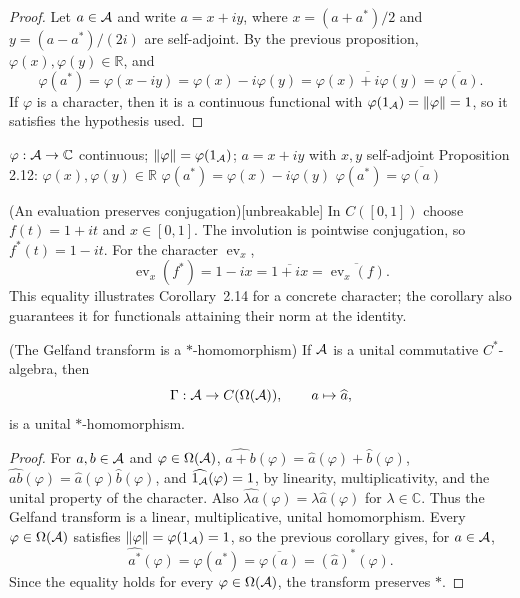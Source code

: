 \begin{proof}[Proof]
Let $a\in\mathcal A$ and write $a=x+iy$, where
$x=(a+a^*)/2$ and $y=(a-a^*)/(2i)$ are self-adjoint. By the previous
proposition, $\varphi(x),\varphi(y)\in\mathbb R$, and
\[
 \varphi(a^*)=\varphi(x-iy)=\varphi(x)-i\varphi(y)
 =\overline{\varphi(x)+i\varphi(y)}=\overline{\varphi(a)}.
\]
If $\varphi$ is a character, then it is a continuous functional with
$\varphi(1_\mathcal A)=\|\varphi\|=1$, so it satisfies the hypothesis used.
\end{proof}

\proofdiagram
{$\varphi:\mathcal A\to\mathbb C$ continuous; $\|\varphi\|=\varphi(1_\mathcal A)$; $a=x+iy$ with $x,y$ self-adjoint}
{Proposition 2.12: $\varphi(x),\varphi(y)\in\mathbb R$}
{$\varphi(a^*)=\varphi(x)-i\varphi(y)$}
{$\varphi(a^*)=\overline{\varphi(a)}$}

\begin{cthejemplo}{(An evaluation preserves conjugation)}[unbreakable]
In $C([0,1])$ choose $f(t)=1+it$ and $x\in[0,1]$.
The involution is pointwise conjugation, so
$f^*(t)=1-it$. For the character $\operatorname{ev}_x$,
\[
 \operatorname{ev}_x(f^*)=1-ix
 =\overline{1+ix}
 =\overline{\operatorname{ev}_x(f)}.
\]
This equality illustrates Corollary~2.14 for a concrete character; the
corollary also guarantees it for functionals attaining their norm at the identity.
\end{cthejemplo}

\begin{cthcorolario}{(The Gelfand transform is a $*$-homomorphism)}
If $\mathcal A$ is a unital commutative $C^*$-algebra, then
\[
 \Gamma:\mathcal A\to C(\Omega(\mathcal A)),\qquad a\mapsto\widehat a,
\]
is a unital $*$-homomorphism.
\end{cthcorolario}

\begin{proof}[Proof]
For $a,b\in\mathcal A$ and $\varphi\in\Omega(\mathcal A)$,
$\widehat{a+b}(\varphi)=\widehat a(\varphi)+\widehat b(\varphi)$,
$\widehat{ab}(\varphi)=\widehat a(\varphi)\widehat b(\varphi)$, and
$\widehat{1_\mathcal A}(\varphi)=1$, by linearity, multiplicativity, and the unital
property of the character. Also
$\widehat{\lambda a}(\varphi)=\lambda\widehat a(\varphi)$ for
$\lambda\in\mathbb C$. Thus the Gelfand transform is a linear,
multiplicative, unital homomorphism. Every $\varphi\in\Omega(\mathcal A)$ satisfies
$\|\varphi\|=\varphi(1_\mathcal A)=1$, so the previous corollary gives, for $a\in\mathcal A$,
\[
 \widehat{a^*}(\varphi)=\varphi(a^*)
 =\overline{\varphi(a)}=(\widehat a)^*(\varphi).
\]
Since the equality holds for every $\varphi\in\Omega(\mathcal A)$, the transform
preserves $*$.
\end{proof}

